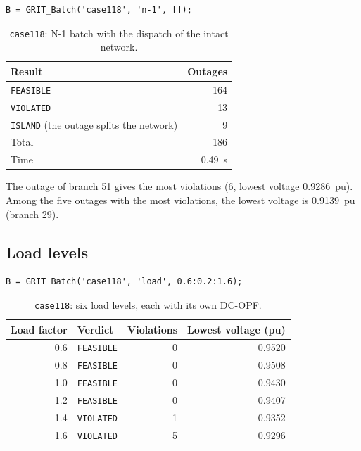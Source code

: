 \documentclass[a4paper,11pt]{article}
\begin{document}
\begin{lstlisting}
B = GRIT_Batch('case118', 'n-1', []);
\end{lstlisting}

\begin{table}[H]\centering
\begin{tabular}{@{}lr@{}}
\toprule
\textbf{Result} & \textbf{Outages} \\
\midrule
\texttt{FEASIBLE} & 164 \\
\texttt{VIOLATED} & 13 \\
\texttt{ISLAND} (the outage splits the network) & 9 \\
\midrule
Total & 186 \\
Time & 0.49~s \\
\bottomrule
\end{tabular}
\caption{\texttt{case118}: N-1 batch with the dispatch of the intact network.}
\end{table}

The outage of branch 51 gives the most violations (6, lowest voltage 0.9286~pu). Among the five outages with the most violations, the lowest voltage is 0.9139~pu (branch 29).

\subsection{Load levels}

\begin{lstlisting}
B = GRIT_Batch('case118', 'load', 0.6:0.2:1.6);
\end{lstlisting}

\begin{table}[H]\centering
\begin{tabular}{@{}rlrr@{}}
\toprule
\textbf{Load factor} & \textbf{Verdict} & \textbf{Violations} & \textbf{Lowest voltage (pu)} \\
\midrule
0.6 & \texttt{FEASIBLE} & 0 & 0.9520 \\
0.8 & \texttt{FEASIBLE} & 0 & 0.9508 \\
1.0 & \texttt{FEASIBLE} & 0 & 0.9430 \\
1.2 & \texttt{FEASIBLE} & 0 & 0.9407 \\
1.4 & \texttt{VIOLATED} & 1 & 0.9352 \\
1.6 & \texttt{VIOLATED} & 5 & 0.9296 \\
\bottomrule
\end{tabular}
\caption{\texttt{case118}: six load levels, each with its own DC-OPF.}
\end{table}
\end{document}
